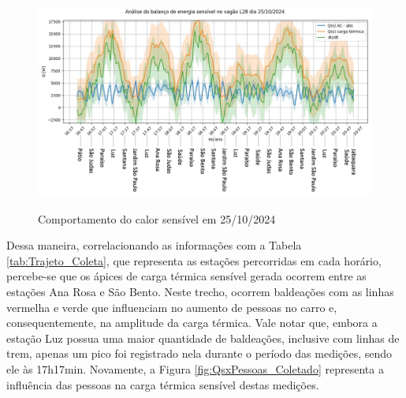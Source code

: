 \documentclass[acronym,symbols,table]{fei}
\begin{document}
\begin{figure}[!htb]
    \centering
    \caption{Comportamento do calor sensível em 25/10/2024}
    \includegraphics[width=0.9\linewidth]{Imagens/Qs_Dados_Coletados.png}
    \label{fig:Qs_Dados_Coletados}
\end{figure}

Dessa maneira, correlacionando as informações com a Tabela \ref{tab:Trajeto_Coleta}, que representa as estações percorridas em cada horário, percebe-se que os ápices de carga térmica sensível gerada ocorrem entre as estações Ana Rosa e São Bento. Neste trecho, ocorrem baldeações com as linhas vermelha e verde que influenciam no aumento de pessoas no carro e, consequentemente, na amplitude da carga térmica. Vale notar que, embora a estação Luz possua uma maior quantidade de baldeações, inclusive com linhas de trem, apenas um pico foi registrado nela durante o período das medições, sendo ele às 17h17min. Novamente, a Figura \ref{fig:QsxPessoas_Coletado} representa a influência das pessoas na carga térmica sensível destas medições.
\end{document}
